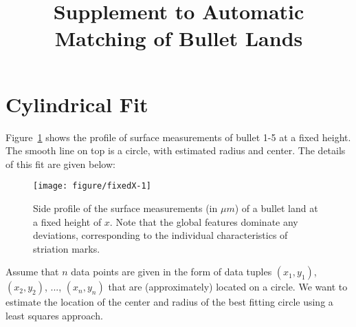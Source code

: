 \documentclass[aoas]{imsart}\usepackage[]{graphicx}\usepackage[]{color}
\newenvironment{knitrout}{}{} %
\begin{document}
\begin{frontmatter}

\title{Supplement to Automatic Matching of Bullet Lands}


\end{frontmatter}

\linenumbers
\tableofcontents
\newpage


\section{Cylindrical Fit}\label{supp:cylindrical}
Figure~\ref{fig:fixedX} shows the  profile of surface measurements of bullet 1-5 at a fixed height. The smooth line on top is a circle, with estimated radius and center. The details of this fit are given below:
%
\begin{figure}[hbtp]
  \centering
\begin{knitrout}
\color{fgcolor}
\texttt{[image: figure/fixedX-1]} 

\end{knitrout}
\caption{\label{fig:fixedX}Side profile of the surface measurements (in $\mu m$) of a bullet land at a fixed height of $x$. Note that the global features dominate any deviations, corresponding to the individual characteristics of striation marks.}
\end{figure}


Assume that $n$ data points are given in the form of data tuples $(x_1, y_1)$, $(x_2, y_2)$, $...$, $(x_n, y_n)$ that are (approximately) located on a circle. We want to estimate the location of the center and radius of the best fitting circle using a least squares approach.
\end{document}
